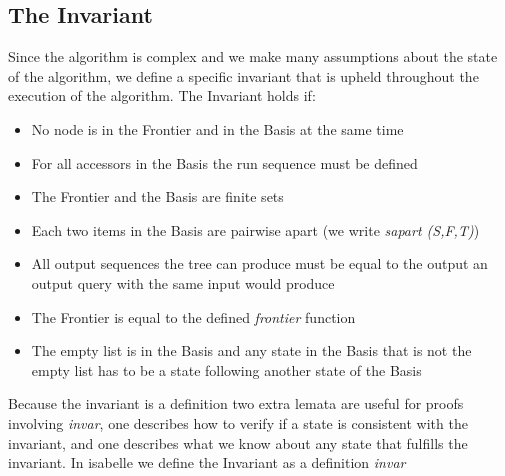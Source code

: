 \subsection{The Invariant}
Since the algorithm is complex and we make many assumptions about the state of the algorithm, we define a specific invariant that is upheld throughout the execution of the algorithm. The Invariant holds if: 
\begin{itemize}
	\item No node is in the Frontier and in the Basis at the same time
	\item For all accessors in the Basis the run sequence must be defined
	\item The Frontier and the Basis are finite sets
	\item Each two items in the Basis are pairwise apart (we write \textit{sapart (S,F,T)})
	\item All output sequences the tree can produce must be equal to the output an output query with the same input would produce
	\item The Frontier is equal to the defined \textit{frontier} function 
	\item The empty list is in the Basis and any state in the Basis that is not the empty list has to be a state following another state of the Basis
\end{itemize}
Because the invariant is a definition two extra lemata are useful for proofs involving \textit{invar}, one describes how to verify if a state is consistent with the invariant, and one describes what we know about any state that fulfills the invariant.
In isabelle we define the Invariant as a definition \textit{invar}
\begin{myisabelle}
	\invar
\end{myisabelle}
